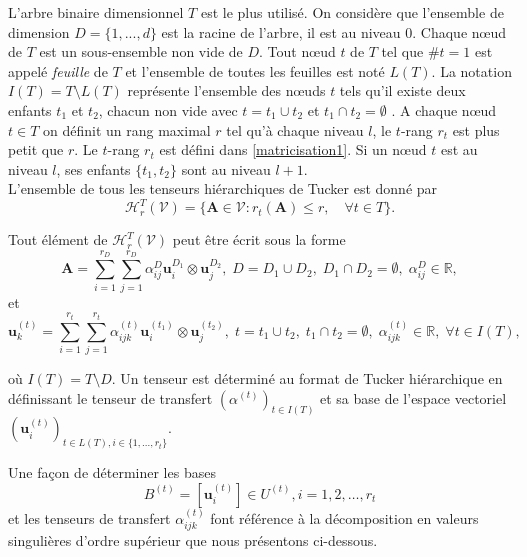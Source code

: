 \documentclass[11pt,a4paper,oneside]{book}
\begin{document}
L'arbre binaire dimensionnel $ T $ est le plus utilisé. On considère que l'ensemble de dimension $D=\lbrace{1,...,d}\rbrace$ est la racine de l'arbre, il est au niveau 0. Chaque nœud de $ T $ est un sous-ensemble non vide de $ D $. Tout nœud $ t $ de $ T $ tel que $ \# t = 1 $ est appelé \textit{feuille} de $ T $ et l'ensemble de toutes les feuilles est noté  $\mathit{L(T)}.$ La notation $\mathit{I(T)}=T \setminus{\mathit{L(T)}}$ représente l'ensemble des nœuds $ t $ tels qu'il existe deux enfants $t_1$ et $t_2$, chacun non vide avec $t=t_1 \cup t_2$ et $t_1 \cap t_2=\emptyset$ \cite[p.319]{hackbusch2012tensor}. A chaque nœud $t \in T$ on définit un rang maximal $ r $ tel qu'à chaque niveau $ l $, le $ t $-rang $r_t$ est plus petit que $ r $. Le $ t $-rang    $r_t$ est défini dans \eqref{matricisation1}. Si un nœud $ t $ est au niveau $ l $, ses enfants $\lbrace{t_1,t_2}\rbrace$ sont au niveau $l+1.$\\

L'ensemble de tous les tenseurs hiérarchiques de Tucker est donné par
\begin{equation}
\mathcal{H}_r^T(\mathcal{V})=\lbrace{\mathbf{A}\in \mathcal{V}:r_t(\mathbf{A})\leq r,\quad \forall t\in T}\rbrace.
\end{equation}

Tout élément de $\mathcal{H}_r^T(\mathcal{V})$ peut être écrit sous la forme
\begin{equation}
\mathbf{A}=\sum_{i=1}^{r_D}{\sum_{j=1}^{r_D}\alpha_{ij}^{D}\mathbf{u}_i^{D_1}\otimes {\mathbf{u}_j^{D_2}}}, \; D=D_1\cup{D_2},\; D_1\cap{D_2}=\emptyset, \; \alpha_{ij}^{D} \in \mathbb{R},
\end{equation}
et
\begin{equation}
\mathbf{u}_k^{(t)}=\sum_{i=1}^{r_t}{\sum_{j=1}^{r_t}\alpha_{ijk}^{(t)}\mathbf{u}_i^{(t_1)}\otimes{\mathbf{u}_j^{(t_2)}}}, \; t=t_1\cup{t_2},\; t_1\cap{t_2}=\emptyset, \; \alpha_{ijk}^{(t)} \in \mathbb{R},\; \forall t\in \mathit{I(T)},
\end{equation}

où $\mathit{I(T)}=T\setminus{D}$. Un tenseur est déterminé au format de Tucker hiérarchique en définissant le tenseur de transfert $(\alpha^{(t)})_{t\in \mathit{I(T)}}$ et sa base  de l'espace vectoriel $(\mathbf{u}_i^{(t)})_{t\in \mathit{L(T)},i\in \lbrace{1,...,r_t}\rbrace}$.


Une façon de déterminer les bases
\begin{equation}
\label{basesHOSVD}
B^{(t)} = \left[\mathbf{u}_i^{(t)}\right] \in U^{(t)}, i = 1,2,\ldots, r_t
\end{equation}
et les tenseurs de transfert $\alpha_{ijk}^{(t)}$ font référence à la décomposition en valeurs singulières d'ordre supérieur que nous présentons ci-dessous.
\end{document}
